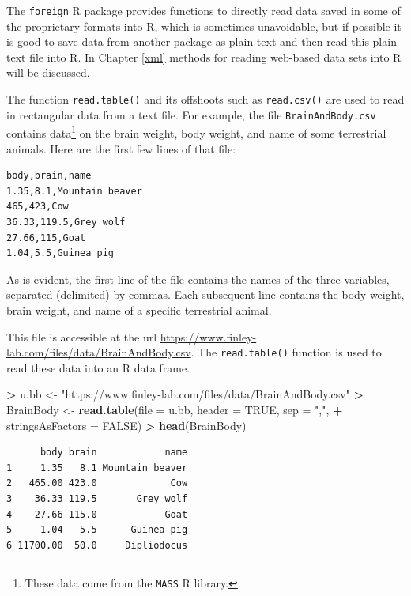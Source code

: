 \documentclass[
]{krantz}
\makeatletter
\newenvironment{Shaded}{\begin{snugshade}}{\end{snugshade}}
\newcommand{\DataTypeTok}[1]{\textcolor[rgb]{0.27,0.27,0.27}{#1}}
\newcommand{\KeywordTok}[1]{\textcolor[rgb]{0.27,0.27,0.27}{\textbf{#1}}}
\newcommand{\NormalTok}[1]{#1}
\newcommand{\OperatorTok}[1]{\textcolor[rgb]{0.43,0.43,0.43}{\textbf{#1}}}
\newcommand{\OtherTok}[1]{\textcolor[rgb]{0.37,0.37,0.37}{#1}}
\newcommand{\StringTok}[1]{\textcolor[rgb]{0.5,0.5,0.5}{#1}}
\newenvironment{kframe}{%
\medskip{}
\setlength{\fboxsep}{.8em}
 \def\at@end@of@kframe{}%
 \ifinner\ifhmode%
  \def\at@end@of@kframe{\end{minipage}}%
  \begin{minipage}{\columnwidth}%
 \fi\fi%
 \def\FrameCommand##1{\hskip\@totalleftmargin \hskip-\fboxsep
 \colorbox{shadecolor}{##1}\hskip-\fboxsep
     \hskip-\linewidth \hskip-\@totalleftmargin \hskip\columnwidth}%
 \MakeFramed {\advance\hsize-\width
   \@totalleftmargin\z@ \linewidth\hsize
   \@setminipage}}%
 {\par\unskip\endMakeFramed%
 \at@end@of@kframe}
\renewenvironment{Shaded}{\begin{kframe}}{\end{kframe}}
\makeatother
\begin{document}
The \texttt{foreign} R package provides functions to directly read data saved in some of the proprietary formats into R, which is sometimes unavoidable, but if possible it is good to save data from another package as plain text and then read this plain text file into R. In Chapter \ref{xml} methods for reading web-based data sets into R will be discussed.

The function \texttt{read.table()} and its offshoots such as \texttt{read.csv()} are used to read in rectangular data from a text file. For example, the file \texttt{BrainAndBody.csv} contains data\footnote{These data come from the \texttt{MASS} R library.} on the brain weight, body weight, and name of some terrestrial animals. Here are the first few lines of that file:

\begin{verbatim}
body,brain,name
1.35,8.1,Mountain beaver
465,423,Cow
36.33,119.5,Grey wolf
27.66,115,Goat
1.04,5.5,Guinea pig
\end{verbatim}

As is evident, the first line of the file contains the names of the three variables, separated (delimited) by commas. Each subsequent line contains the body weight, brain weight, and name of a specific terrestrial animal.

This file is accessible at the url \url{https://www.finley-lab.com/files/data/BrainAndBody.csv}. The \texttt{read.table()} function is used to read these data into an R data frame.

\begin{Shaded}
\begin{Highlighting}[]
\OperatorTok{\textgreater{}}\StringTok{ }\NormalTok{u.bb \textless{}{-}}\StringTok{ "https://www.finley{-}lab.com/files/data/BrainAndBody.csv"}
\OperatorTok{\textgreater{}}\StringTok{ }\NormalTok{BrainBody \textless{}{-}}\StringTok{ }\KeywordTok{read.table}\NormalTok{(}\DataTypeTok{file =}\NormalTok{ u.bb, }\DataTypeTok{header =} \OtherTok{TRUE}\NormalTok{, }\DataTypeTok{sep =} \StringTok{","}\NormalTok{, }
\OperatorTok{+}\StringTok{                         }\DataTypeTok{stringsAsFactors =} \OtherTok{FALSE}\NormalTok{)}
\OperatorTok{\textgreater{}}\StringTok{ }\KeywordTok{head}\NormalTok{(BrainBody)}
\end{Highlighting}
\end{Shaded}

\begin{verbatim}
      body brain            name
1     1.35   8.1 Mountain beaver
2   465.00 423.0             Cow
3    36.33 119.5       Grey wolf
4    27.66 115.0            Goat
5     1.04   5.5      Guinea pig
6 11700.00  50.0     Dipliodocus
\end{verbatim}
\end{document}
